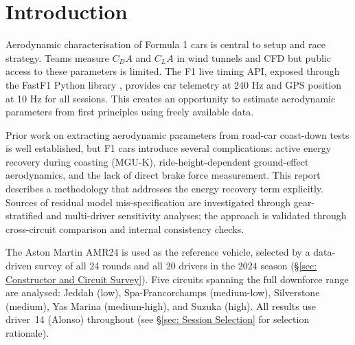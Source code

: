 \section{Introduction}
\label{sec: Introduction}

Aerodynamic characterisation of Formula 1 cars is central to setup and race strategy. Teams measure $C_DA$ and $C_LA$ in wind tunnels and CFD but public access to these parameters is limited. The F1 live timing API, exposed through the FastF1 Python library \cite{FastF1}, provides car telemetry at 240 Hz and GPS position at 10 Hz for all sessions. This creates an opportunity to estimate aerodynamic parameters from first principles using freely available data.

Prior work on extracting aerodynamic parameters from road-car coast-down tests is well established, but F1 cars introduce several complications: active energy recovery during coasting (MGU-K), ride-height-dependent ground-effect aerodynamics, and the lack of direct brake force measurement. This report describes a methodology that addresses the energy recovery term explicitly. Sources of residual model mis-specification are investigated through gear-stratified and multi-driver sensitivity analyses; the approach is validated through cross-circuit comparison and internal consistency checks.

The Aston Martin AMR24 is used as the reference vehicle, selected by a data-driven survey of all 24 rounds and all 20 drivers in the 2024 season (\S\ref{sec: Constructor and Circuit Survey}). Five circuits spanning the full downforce range are analysed: Jeddah (low), Spa-Francorchamps (medium-low), Silverstone (medium), Yas Marina (medium-high), and Suzuka (high). All results use driver~14 (Alonso) throughout (see \S\ref{sec: Session Selection} for selection rationale).
